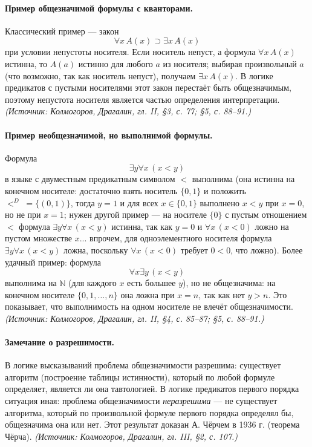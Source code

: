 \documentclass[a4paper,12pt]{article}
\begin{document}
\paragraph{Пример общезначимой формулы с кванторами.} Классический пример — закон
\[
\forall x\,A(x)\supset\exists x\,A(x)
\]
при условии непустоты носителя. Если носитель непуст, а формула \(\forall x\,A(x)\) истинна, то \(A(a)\) истинно для любого \(a\) из носителя; выбирая произвольный \(a\) (что возможно, так как носитель непуст), получаем \(\exists x\,A(x)\). В логике предикатов с пустыми носителями этот закон перестаёт быть общезначимым, поэтому непустота носителя является частью определения интерпретации.
\textit{(Источник: Колмогоров, Драгалин, гл. II, §3, с. 77; §5, с. 88--91.)}

\paragraph{Пример необщезначимой, но выполнимой формулы.} Формула
\[
\exists y\forall x\,(x<y)
\]
в языке с двуместным предикатным символом \(<\) выполнима (она истинна на конечном носителе: достаточно взять носитель \(\{0,1\}\) и положить \(<^D\;=\{(0,1)\}\), тогда \(y=1\) и для всех \(x\in\{0,1\}\) выполнено \(x<y\) при \(x=0\), но не при \(x=1\); нужен другой пример — на носителе \(\{0\}\) с пустым отношением \(<\) формула \(\exists y\forall x\,(x<y)\) истинна, так как \(y=0\) и \(\forall x\,(x<0)\) ложно на пустом множестве \(x\)... впрочем, для одноэлементного носителя формула \(\exists y\forall x\,(x<y)\) ложна, поскольку \(\forall x\,(x<0)\) требует \(0<0\), что ложно). Более удачный пример: формула
\[
\forall x\exists y\,(x<y)
\]
выполнима на \(\mathbb{N}\) (для каждого \(x\) есть большее \(y\)), но не общезначима: на конечном носителе \(\{0,1,\ldots,n\}\) она ложна при \(x=n\), так как нет \(y>n\). Это показывает, что выполнимость на одном носителе не влечёт общезначимости.
\textit{(Источник: Колмогоров, Драгалин, гл. II, §4, с. 85--87; §5, с. 88--91.)}

\paragraph{Замечание о разрешимости.} В логике высказываний проблема общезначимости разрешима: существует алгоритм (построение таблицы истинности), который по любой формуле определяет, является ли она тавтологией. В логике предикатов первого порядка ситуация иная: проблема общезначимости \emph{неразрешима} — не существует алгоритма, который по произвольной формуле первого порядка определял бы, общезначима она или нет. Этот результат доказан А. Чёрчем в 1936 г. (теорема Чёрча).
\textit{(Источник: Колмогоров, Драгалин, гл. III, §2, с. 107.)}
\end{document}
